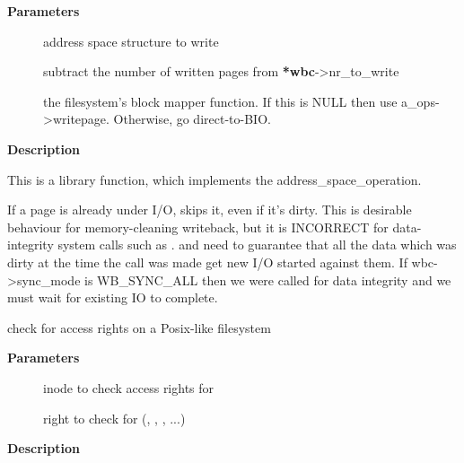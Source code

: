 \documentclass[a4paper,8pt,english]{sphinxmanual}
\begin{document}
\textbf{Parameters}
\begin{description}
\item[{}] \leavevmode
address space structure to write

\item[{}] \leavevmode
subtract the number of written pages from \textbf{*wbc}-\textgreater{}nr\_to\_write

\item[{}] \leavevmode
the filesystem's block mapper function.
If this is NULL then use a\_ops-\textgreater{}writepage.  Otherwise, go
direct-to-BIO.

\end{description}

\textbf{Description}

This is a library function, which implements the 
address\_space\_operation.

If a page is already under I/O,  skips it, even
if it's dirty.  This is desirable behaviour for memory-cleaning writeback,
but it is INCORRECT for data-integrity system calls such as .  
and  need to guarantee that all the data which was dirty at the time
the call was made get new I/O started against them.  If wbc-\textgreater{}sync\_mode is
WB\_SYNC\_ALL then we were called for data integrity and we must wait for
existing IO to complete.

\begin{fulllineitems}
\label{filesystems/index:c.generic_permission}
check for access rights on a Posix-like filesystem

\end{fulllineitems}


\textbf{Parameters}
\begin{description}
\item[{}] \leavevmode
inode to check access rights for

\item[{}] \leavevmode
right to check for (, , , ...)

\end{description}

\textbf{Description}
\end{document}

